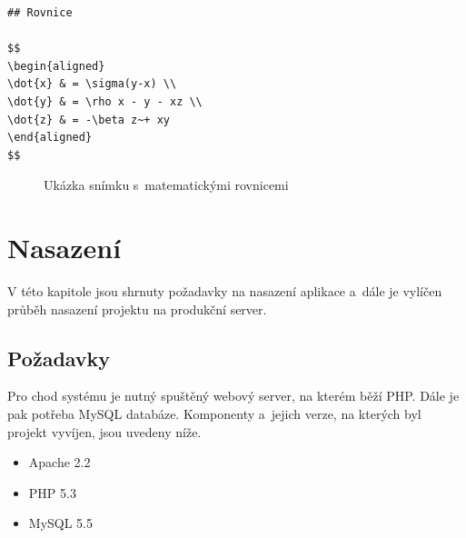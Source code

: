 \documentclass[11pt,twoside,a4paper]{book}
\begin{document}
\begin{lstlisting}[caption={Ukázka syntaxe matematických vzorců},label={lst:rovnice},captionpos=b]
## Rovnice

$$
\begin{aligned}
\dot{x} & = \sigma(y-x) \\
\dot{y} & = \rho x - y - xz \\
\dot{z} & = -\beta z~+ xy
\end{aligned}
$$
\end{lstlisting}

\begin{figure}[ht]
	\begin{center}
		\caption{Ukázka snímku s~matematickými rovnicemi}
		\label{fig:rovnice}
	\end{center}
\end{figure}



\chapter{Nasazení}
V této kapitole jsou shrnuty požadavky na nasazení aplikace a~dále je vylíčen průběh nasazení projektu na produkční server.

\section{Požadavky}
Pro chod systému je nutný spuštěný webový server, na kterém běží PHP. Dále je pak potřeba MySQL databáze. Komponenty a~jejich verze, na kterých byl projekt vyvíjen, jsou uvedeny níže.

\begin{itemize}
	\item Apache 2.2
	\item PHP 5.3
	\item MySQL 5.5
\end{itemize}
\end{document}
